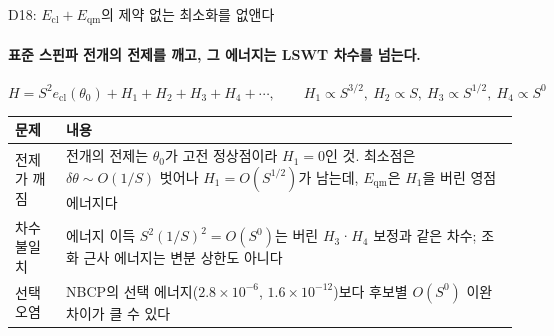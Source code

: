 \begin{frame}[label=quantum-removal]{D18: $E_{\mathrm{cl}}+E_{\mathrm{qm}}$의 제약 없는 최소화를 없앤다}
  \framesubtitle{표준 스핀파 전개의 전제를 깨고, 그 에너지는 LSWT 차수를 넘는다.}
  \[
    H = S^2 e_{\mathrm{cl}}(\theta_0) + H_1 + H_2 + H_3 + H_4 + \cdots,
    \qquad H_1 \propto S^{3/2},\ H_2 \propto S,\ H_3 \propto S^{1/2},\ H_4 \propto S^0
  \]
  \small
  \begin{tabularx}{\textwidth}{@{}P{3.3cm}Y@{}}
    \toprule
    문제 & 내용 \\
    \midrule
    전제가 깨짐 & 전개의 전제는 $\theta_0$가 고전 정상점이라 $H_1=0$인 것. 최소점은 $\delta\theta\sim O(1/S)$ 벗어나 $H_1=O(S^{1/2})$가 남는데, $E_{\mathrm{qm}}$은 $H_1$을 버린 영점 에너지다 \\
    차수 불일치 & 에너지 이득 $S^2(1/S)^2=O(S^0)$는 버린 $H_3$·$H_4$ 보정과 같은 차수; 조화 근사 에너지는 변분 상한도 아니다 \\
    선택 오염 & NBCP의 선택 에너지($2.8\times10^{-6}$, $1.6\times10^{-12}$)보다 후보별 $O(S^0)$ 이완 차이가 클 수 있다 \\
    \bottomrule
  \end{tabularx}
  \par\medskip
\end{frame}

